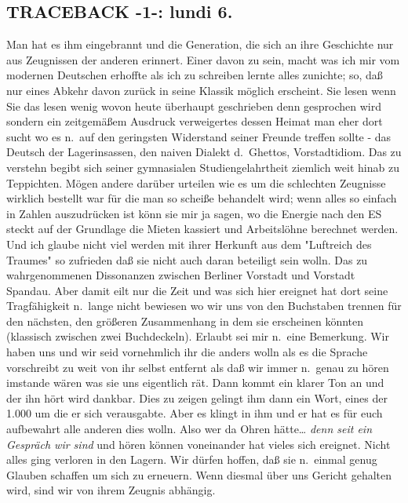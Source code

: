 \documentclass[
]{article}
\author{}
\date{\vspace{-2.5em}}
\begin{document}
\subsection{TRACEBACK -1-: lundi 6.}\label{traceback--1--lundi-6.}

Man hat es ihm eingebrannt und die Generation, die sich an ihre
Geschichte nur aus Zeugnissen der anderen erinnert. Einer davon zu sein,
macht was ich mir vom modernen Deutschen erhoffte als ich zu schreiben
lernte alles zunichte; so, daß nur eines Abkehr davon zurück in seine
Klassik möglich erscheint. Sie lesen wenn Sie das lesen wenig wovon
heute überhaupt geschrieben denn gesprochen wird sondern ein zeitgemäßem
Ausdruck verweigertes dessen Heimat man eher dort sucht wo es n.~auf den
geringsten Widerstand seiner Freunde treffen sollte - das Deutsch der
Lagerinsassen, den naiven Dialekt d.~Ghettos, Vorstadtidiom. Das zu
verstehn begibt sich seiner gymnasialen Studiengelahrtheit ziemlich weit
hinab zu Teppichten. Mögen andere darüber urteilen wie es um die
schlechten Zeugnisse wirklich bestellt war für die man so scheiße
behandelt wird; wenn alles so einfach in Zahlen auszudrücken ist könn
sie mir ja sagen, wo die Energie nach den ES steckt auf der Grundlage
die Mieten kassiert und Arbeitslöhne berechnet werden. Und ich glaube
nicht viel werden mit ihrer Herkunft aus dem "Luftreich des Traumes" so
zufrieden daß sie nicht auch daran beteiligt sein wolln. Das zu
wahrgenommenen Dissonanzen zwischen Berliner Vorstadt und Vorstadt
Spandau. Aber damit eilt nur die Zeit und was sich hier ereignet hat
dort seine Tragfähigkeit n.~lange nicht bewiesen wo wir uns von den
Buchstaben trennen für den nächsten, den größeren Zusammenhang in dem
sie erscheinen könnten (klassisch zwischen zwei Buchdeckeln). Erlaubt
sei mir n.~eine Bemerkung. Wir haben uns und wir seid vornehmlich ihr
die anders wolln als es die Sprache vorschreibt zu weit von ihr selbst
entfernt als daß wir immer n.~genau zu hören imstande wären was sie uns
eigentlich rät. Dann kommt ein klarer Ton an und der ihn hört wird
dankbar. Dies zu zeigen gelingt ihm dann ein Wort, eines der 1.000 um
die er sich verausgabte. Aber es klingt in ihm und er hat es für euch
aufbewahrt alle anderen dies wolln. Also wer da Ohren hätte\ldots{}
\emph{denn seit ein Gespräch wir sind} und hören können voneinander hat
vieles sich ereignet. Nicht alles ging verloren in den Lagern. Wir
dürfen hoffen, daß sie n.~einmal genug Glauben schaffen um sich zu
erneuern. Wenn diesmal über uns Gericht gehalten wird, sind wir von
ihrem Zeugnis abhängig.\\
\end{document}
